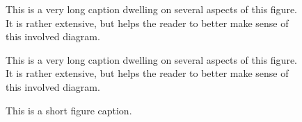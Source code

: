 \lipsum[4-5]

\begin{figure}
\caption{This is a very long caption dwelling on several aspects of this figure. It is rather extensive, but helps the reader to better make sense of this involved diagram.}
\end{figure}

\lipsum[5]



\begin{figure}

\caption{This is a very long caption dwelling on several aspects of this figure. It is rather extensive, but helps the reader to better make sense of this involved diagram.}
\end{figure}

\lipsum[4-5]

\begin{figure}
\caption{This is a short figure caption.}
\end{figure}

\lipsum[5]


